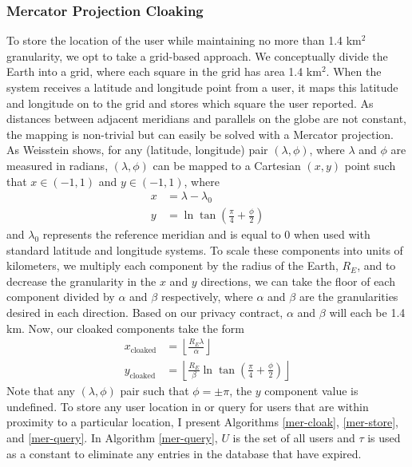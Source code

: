 \subsubsection{Mercator Projection Cloaking}

To store the location of the user while maintaining no more than 1.4 km$^2$ granularity, we opt to take a grid-based approach. We conceptually divide the Earth into a grid, where each square in the grid has area 1.4 km$^2$. When the system receives a latitude and longitude point from a user, it maps this latitude and longitude on to the grid and stores which square the user reported. As distances between adjacent meridians and parallels on the globe are not constant, the mapping is non-trivial but can easily be solved with a Mercator projection. As Weisstein \cite{mercator} shows, for any (latitude, longitude) pair $(\lambda, \phi)$, where $\lambda$ and $\phi$ are measured in radians, $(\lambda, \phi)$ can be mapped to a Cartesian $(x, y)$ point such that $x \in (-1, 1)$ and $y \in (-1, 1)$, where
\begin{align*}
    x &= \lambda - \lambda_0\\
    y &= \ln \tan \left(\frac{\pi}{4} + \frac{\phi}{2} \right)
\end{align*}
and $\lambda_0$ represents the reference meridian and is equal to 0 when used with standard latitude and longitude systems. To scale these components into units of kilometers, we multiply each component by the radius of the Earth, $R_E$, and to decrease the granularity in the $x$ and $y$ directions, we can take the floor of each component divided by $\alpha$ and $\beta$ respectively, where $\alpha$ and $\beta$ are the granularities desired in each direction. Based on our privacy contract, $\alpha$ and $\beta$ will each be 1.4 km. Now, our cloaked components take the form
\begin{align*}
    x_{\text{cloaked}} &= \left\lfloor \frac{R_E\lambda}{\alpha} \right\rfloor \\
    y_{\text{cloaked}} &= \left\lfloor \frac{R_E}{\beta} \ln \tan\left( \frac{\pi}{4} + \frac{\phi}{2} \right) \right\rfloor
\end{align*}
Note that any $(\lambda, \phi)$ pair such that $\phi = \pm\pi$, the $y$ component value is undefined. To store any user location in or query for users that are within proximity to a particular location, I present Algorithms \ref{mer-cloak}, \ref{mer-store}, and \ref{mer-query}. In Algorithm \ref{mer-query}, $U$ is the set of all users and $\tau$ is used as a constant to eliminate any entries in the database that have expired.

